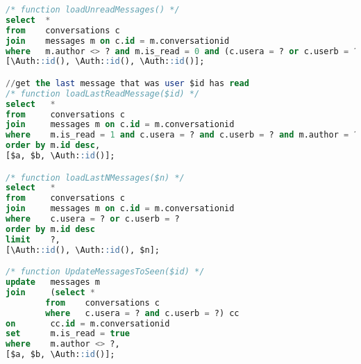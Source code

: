 \begin{lstlisting}[language=sql]
/* function loadUnreadMessages() */
select  *
from    conversations c
join    messages m on c.id = m.conversationid
where   m.author <> ? and m.is_read = 0 and (c.usera = ? or c.userb = ?),
[\Auth::id(), \Auth::id(), \Auth::id()];

//get the last message that was user $id has read
/* function loadLastReadMessage($id) */
select   *
from     conversations c
join     messages m on c.id = m.conversationid
where    m.is_read = 1 and c.usera = ? and c.userb = ? and m.author = ?
order by m.id desc,
[$a, $b, \Auth::id()];

/* function loadLastNMessages($n) */
select   *
from     conversations c
join     messages m on c.id = m.conversationid
where    c.usera = ? or c.userb = ?
order by m.id desc
limit    ?,
[\Auth::id(), \Auth::id(), $n];

/* function UpdateMessagesToSeen($id) */
update   messages m
join     (select *
        from    conversations c
        where   c.usera = ? and c.userb = ?) cc
on       cc.id = m.conversationid
set      m.is_read = true
where    m.author <> ?,
[$a, $b, \Auth::id()];

\end{lstlisting}
